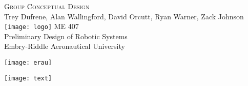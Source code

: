 \begin{titlepage}
\flushleft
\doublespacing
\Large
\textsc{Group Conceptual Design} \\
\normalsize
Trey Dufrene, Alan Wallingford, David Orcutt, Ryan Warner, Zack Johnson
\vfill
\center
\texttt{[image: logo]}
\vfill
\flushleft
ME 407 \\
Preliminary Design of Robotic Systems \\
Embry-Riddle Aeronautical University \\
\vspace{2ex}
\begin{minipage}[c]{.5\textwidth}
\flushleft
\texttt{[image: erau]}
\end{minipage}%
\begin{minipage}[c]{.5\textwidth}
\flushright
\texttt{[image: text]}
\end{minipage}
\end{titlepage}
